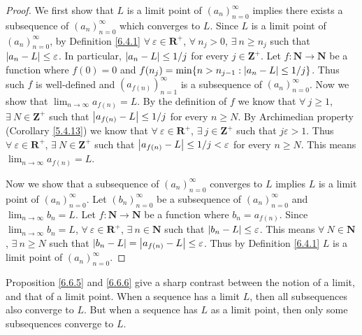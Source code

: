 \begin{proof}
    We first show that \(L\) is a limit point of \((a_n)_{n = 0}^\infty\) implies there exists a subsequence of \((a_n)_{n = 0}^\infty\) which converges to \(L\).
    Since \(L\) is a limit point of \((a_n)_{n = 0}^\infty\), by Definition \ref{6.4.1} \(\forall\ \varepsilon \in \mathbf{R}^+\), \(\forall\ n_j > 0\), \(\exists\ n \geq n_j\) such that \(\abs*{a_n - L} \leq \varepsilon\).
    In particular, \(\abs*{a_n - L} \leq 1 / j\) for every \(j \in \mathbf{Z}^+\).
    Let \(f : \mathbf{N} \to \mathbf{N}\) be a function where \(f(0) = 0\) and \(f(n_j) = \min\{n > n_{j - 1} : \abs*{a_n - L} \leq 1 / j\}\).
    Thus such \(f\) is well-defined and \((a_{f(n)})_{n = 1}^\infty\) is a subsequence of \((a_n)_{n = 0}^\infty\).
    Now we show that \(\lim_{n \to \infty} a_{f(n)} = L\).
    By the definition of \(f\) we know that \(\forall\ j \geq 1\), \(\exists\ N \in \mathbf{Z}^+\) such that \(\abs*{a_{f(n)} - L} \leq 1 / j\) for every \(n \geq N\).
    By Archimedian property (Corollary \ref{5.4.13}) we know that \(\forall\ \varepsilon \in \mathbf{R}^+\), \(\exists\ j \in \mathbf{Z}^+\) such that \(j \varepsilon > 1\).
    Thus \(\forall\ \varepsilon \in \mathbf{R}^+\), \(\exists\ N \in \mathbf{Z}^+\) such that \(\abs*{a_{f(n)} - L} \leq 1 / j < \varepsilon\) for every \(n \geq N\).
    This means \(\lim_{n \to \infty} a_{f(n)} = L\).

    Now we show that a subsequence of \((a_n)_{n = 0}^\infty\) converges to \(L\) implies \(L\) is a limit point of \((a_n)_{n = 0}^\infty\).
    Let \((b_n)_{n = 0}^\infty\) be a subsequence of \((a_n)_{n = 0}^\infty\) and \(\lim_{n \to \infty} b_n = L\).
    Let \(f : \mathbf{N} \to \mathbf{N}\) be a function where \(b_n = a_{f(n)}\).
    Since \(\lim_{n \to \infty} b_n = L\), \(\forall\ \varepsilon \in \mathbf{R}^+\), \(\exists\ n \in \mathbf{N}\) such that \(\abs*{b_n - L} \leq \varepsilon\).
    This means \(\forall\ N \in \mathbf{N}\), \(\exists\ n \geq N\) such that \(\abs*{b_n - L} = \abs*{a_{f(n)} - L} \leq \varepsilon\).
    Thus by Definition \ref{6.4.1} \(L\) is a limit point of \((a_n)_{n = 0}^\infty\).
\end{proof}

\begin{remark}\label{6.6.7}
    Proposition \ref{6.6.5} and \ref{6.6.6} give a sharp contrast between the notion of a limit, and that of a limit point.
    When a sequence has a limit \(L\), then all subsequences also converge to \(L\).
    But when a sequence has \(L\) as a limit point, then only some subsequences converge to \(L\).
\end{remark}

